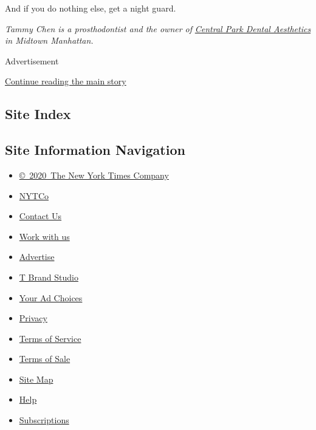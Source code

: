 And if you do nothing else, get a night guard.

\emph{Tammy Chen is a prosthodontist and the owner of}
\href{https://www.cpdanyc.com/}{\emph{Central Park Dental Aesthetics}}
\emph{in Midtown Manhattan.}

Advertisement

\protect\hyperlink{after-bottom}{Continue reading the main story}

\hypertarget{site-index}{%
\subsection{Site Index}\label{site-index}}

\hypertarget{site-information-navigation}{%
\subsection{Site Information
Navigation}\label{site-information-navigation}}

\begin{itemize}
\tightlist
\item
  \href{https://help.nytimes3xbfgragh.onion/hc/en-us/articles/115014792127-Copyright-notice}{©~2020~The
  New York Times Company}
\end{itemize}

\begin{itemize}
\tightlist
\item
  \href{https://www.nytco.com/}{NYTCo}
\item
  \href{https://help.nytimes3xbfgragh.onion/hc/en-us/articles/115015385887-Contact-Us}{Contact
  Us}
\item
  \href{https://www.nytco.com/careers/}{Work with us}
\item
  \href{https://nytmediakit.com/}{Advertise}
\item
  \href{http://www.tbrandstudio.com/}{T Brand Studio}
\item
  \href{https://www.nytimes3xbfgragh.onion/privacy/cookie-policy\#how-do-i-manage-trackers}{Your
  Ad Choices}
\item
  \href{https://www.nytimes3xbfgragh.onion/privacy}{Privacy}
\item
  \href{https://help.nytimes3xbfgragh.onion/hc/en-us/articles/115014893428-Terms-of-service}{Terms
  of Service}
\item
  \href{https://help.nytimes3xbfgragh.onion/hc/en-us/articles/115014893968-Terms-of-sale}{Terms
  of Sale}
\item
  \href{https://spiderbites.nytimes3xbfgragh.onion}{Site Map}
\item
  \href{https://help.nytimes3xbfgragh.onion/hc/en-us}{Help}
\item
  \href{https://www.nytimes3xbfgragh.onion/subscription?campaignId=37WXW}{Subscriptions}
\end{itemize}
